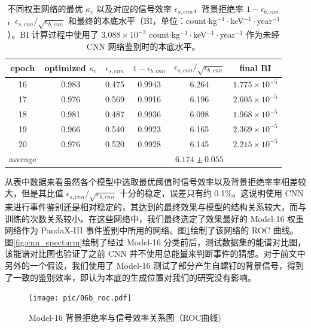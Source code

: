\begin{table}
    \centering
    \caption{不同权重网络的最优 $\kappa_c$ 以及对应的信号效率 $\epsilon_{s,cnn}$，背景拒绝率 $1-\epsilon_{b,cnn}$，$\epsilon_{s,cnn}/\sqrt{\epsilon_{b,cnn}}$ 和最终的本底水平（BI，单位：count$\cdot$kg$^{-1}\cdot$keV$^{-1}\cdot$year$^{-1}$）。BI 计算过程中使用了 $3.088\times10^{-3}$ count$\cdot$kg$^{-1}\cdot$keV$^{-1}\cdot$year$^{-1}$ 作为未经 CNN 网络鉴别时的本底水平。}
    \begin{tabular}{cccccc}
      \\\hline
      epoch & optimized $\kappa_c$ & $\epsilon_{s,cnn}$ & $ 1-\epsilon_{b,cnn}$ &$\epsilon_{s,cnn}/\sqrt{\epsilon_{b,cnn}}$ & final BI\\\hline
      16 & 0.983 & 0.475 & 0.9943 & 6.264 & $1.775\times10^{-5}$ \\
      17 & 0.976 & 0.569 & 0.9916 & 6.196 & $2.605\times10^{-5}$ \\
      18 & 0.981 & 0.487 & 0.9936 & 6.098 & $1.968\times10^{-5}$ \\
      19 & 0.966 & 0.540 & 0.9923 & 6.165 & $2.369\times10^{-5}$ \\
      20 & 0.976 & 0.520 & 0.9928 & 6.145 & $2.215\times10^{-5}$ \\\hline
      average &  &  &  & $6.174\pm0.055$ \\\hline
    \end{tabular}
    \label{tab:efficiencies}
  \end{table}
  
从表中数据来看虽然各个模型中选取最优阈值时信号效率以及背景拒绝率率相差较大，但是其比值 $\epsilon_{s,cnn}/\sqrt{\epsilon_{b,cnn}}$ 十分的稳定，误差只有约 0.1\%。这说明使用 CNN 来进行事件鉴别还是相对稳定的，其达到的最终效果与模型的结构关系较大，而与训练的次数关系较小。在这些网络中，我们最终选定了效果最好的 Model-16 权重网络作为 PandaX-III 事件鉴别中所用的网络。图\ref{fig:cnn_roc}绘制了该网络的 ROC 曲线。图\ref{fig:cnn_specturm}绘制了经过 Model-16 分类前后，测试数据集的能谱对比图，该能谱对比图也验证了之前 CNN 并不使用总能量来判断事件的猜想。对于前文中另外的一个假设，我们使用了 Model-16 测试了部分产生自螺钉的背景信号，得到了一致的鉴别效率，即认为本底的生成位置对我们的研究没有影响。

\begin{figure}
    \centering
    \texttt{[image: pic/06b\_roc.pdf]}
    \caption{Model-16 背景拒绝率与信号效率关系图（ROC曲线)}
    \label{fig:cnn_roc}
\end{figure}

